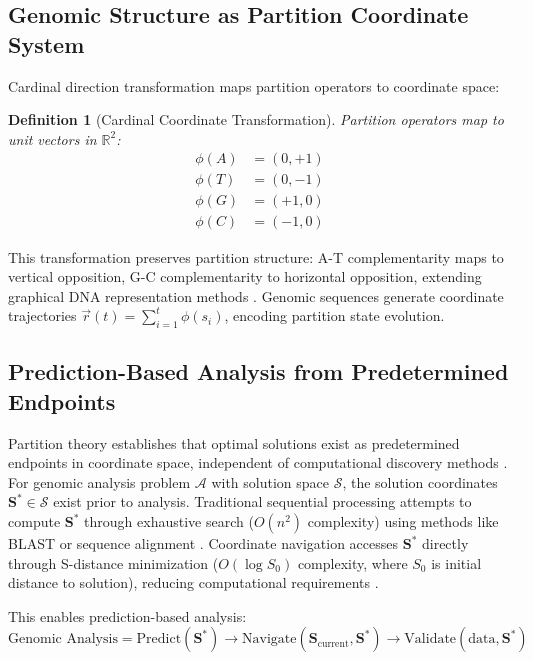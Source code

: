 \documentclass[11pt,a4paper]{article}
\newtheorem{definition}[theorem]{Definition}
\theoremstyle{remark}
\newcommand{\Scoord}{\mathbf{S}}
\begin{document}
\subsection{Genomic Structure as Partition Coordinate System}

Cardinal direction transformation maps partition operators to coordinate space:

\begin{definition}[Cardinal Coordinate Transformation]
\label{def:cardinal_transform}
Partition operators map to unit vectors in $\mathbb{R}^2$:
\begin{align}
\phi(A) &= (0, +1) \\
\phi(T) &= (0, -1) \\
\phi(G) &= (+1, 0) \\
\phi(C) &= (-1, 0)
\end{align}
\end{definition}

This transformation preserves partition structure: A-T complementarity maps to vertical opposition, G-C complementarity to horizontal opposition, extending graphical DNA representation methods \citep{nandy2006graphical, randic2003novel, yau2003dna}. Genomic sequences generate coordinate trajectories $\vec{r}(t) = \sum_{i=1}^t \phi(s_i)$, encoding partition state evolution.

\subsection{Prediction-Based Analysis from Predetermined Endpoints}

Partition theory establishes that optimal solutions exist as predetermined endpoints in coordinate space, independent of computational discovery methods \citep{poincare1890probleme, Sachikonye2025_Poincare}. For genomic analysis problem $\mathcal{A}$ with solution space $\mathcal{S}$, the solution coordinates $\Scoord^* \in \mathcal{S}$ exist prior to analysis. Traditional sequential processing attempts to compute $\Scoord^*$ through exhaustive search ($O(n^2)$ complexity) using methods like BLAST or sequence alignment \citep{altschul1990basic, needleman1970general, smith1981identification}. Coordinate navigation accesses $\Scoord^*$ directly through S-distance minimization ($O(\log S_0)$ complexity, where $S_0$ is initial distance to solution), reducing computational requirements \citep{landauer1961irreversibility}.

This enables prediction-based analysis:
\begin{equation}
\text{Genomic Analysis} = \text{Predict}(\Scoord^*) \to \text{Navigate}(\Scoord_{\text{current}}, \Scoord^*) \to \text{Validate}(\text{data}, \Scoord^*)
\end{equation}
\end{document}
